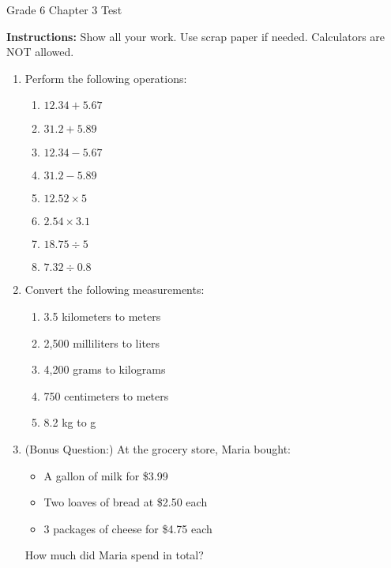 \documentclass[12pt]{article}
\begin{document}
\centerline{\Large Grade 6 Chapter 3 Test}
\vspace{0.5in}

\textbf{Instructions:} Show all your work. Use scrap paper if needed. Calculators are NOT allowed.

\begin{enumerate}
\item Perform the following operations:
\begin{enumerate}
    \item $12.34 + 5.67$
    \item $31.2 + 5.89$
    \item $12.34 - 5.67$
    \item $31.2 - 5.89$
    \item $12.52 \times 5$
    \item $2.54 \times 3.1$
    \item $18.75 \div 5$
    \item $7.32 \div 0.8$
\end{enumerate}

\item Convert the following measurements:
\begin{enumerate}
    \item 3.5 kilometers to meters
    \item 2,500 milliliters to liters
    \item 4,200 grams to kilograms
    \item 750 centimeters to meters
    \item 8.2 kg to g
\end{enumerate}

\item (Bonus Question:) At the grocery store, Maria bought:
\begin{itemize}
    \item A gallon of milk for \$3.99
    \item Two loaves of bread at \$2.50 each
    \item 3 packages of cheese for \$4.75 each
\end{itemize}
How much did Maria spend in total?


\end{enumerate}
\end{document}

